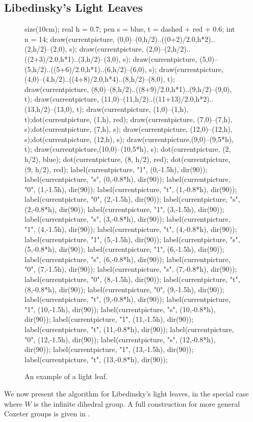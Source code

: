 \subsection{Libedinsky's Light Leaves}
\label{sec:prelim_lightleave}
\begin{figure}[ht]
	\centering
	\begin{asy}
	size(10cm);
	real h = 0.7;
	pen s = blue, t = dashed + red + 0.6;
	int n = 14;
	draw(currentpicture, (0,0)--(0,h/2)..((0+2)/2.0,h*2)..(2,h/2)--(2,0), s);
	draw(currentpicture, (2,0)--(2,h/2)..((2+3)/2.0,h*1)..(3,h/2)--(3,0), s);
	draw(currentpicture, (5,0)--(5,h/2)..((5+6)/2.0,h*1)..(6,h/2)--(6,0), s);
	draw(currentpicture, (4,0)--(4,h/2)..((4+8)/2.0,h*4)..(8,h/2)--(8,0), t);
	draw(currentpicture, (8,0)--(8,h/2)..((8+9)/2.0,h*1)..(9,h/2)--(9,0), t);
	draw(currentpicture, (11,0)--(11,h/2)..((11+13)/2.0,h*2)..(13,h/2)--(13,0), t);
	draw(currentpicture, (1,0)--(1,h), t);dot(currentpicture, (1,h), red);
	draw(currentpicture, (7,0)--(7,h), s);dot(currentpicture, (7,h), s);
	draw(currentpicture, (12,0)--(12,h), s);dot(currentpicture, (12,h), s);
	draw(currentpicture,(9,0)--(9,5*h), t);
	draw(currentpicture,(10,0)--(10,5*h), s);
	dot(currentpicture, (2, h/2), blue);
	dot(currentpicture, (8, h/2), red);
	dot(currentpicture, (9, h/2), red);
	label(currentpicture, "1", (0,-1.5h), dir(90));
	label(currentpicture, "s", (0,-0.8*h), dir(90));
	label(currentpicture, "0", (1,-1.5h), dir(90));
	label(currentpicture, "t", (1,-0.8*h), dir(90));
	label(currentpicture, "0", (2,-1.5h), dir(90));
	label(currentpicture, "s", (2,-0.8*h), dir(90));
	label(currentpicture, "1", (3,-1.5h), dir(90));
	label(currentpicture, "s", (3,-0.8*h), dir(90));
	label(currentpicture, "1", (4,-1.5h), dir(90));
	label(currentpicture, "t", (4,-0.8*h), dir(90));
	label(currentpicture, "1", (5,-1.5h), dir(90));
	label(currentpicture, "s", (5,-0.8*h), dir(90));
	label(currentpicture, "1", (6,-1.5h), dir(90));
	label(currentpicture, "s", (6,-0.8*h), dir(90));
	label(currentpicture, "0", (7,-1.5h), dir(90));
	label(currentpicture, "s", (7,-0.8*h), dir(90));
	label(currentpicture, "0", (8,-1.5h), dir(90));
	label(currentpicture, "t", (8,-0.8*h), dir(90));
	label(currentpicture, "0", (9,-1.5h), dir(90));
	label(currentpicture, "t", (9,-0.8*h), dir(90));
	label(currentpicture, "1", (10,-1.5h), dir(90));
	label(currentpicture, "s", (10,-0.8*h), dir(90));
	label(currentpicture, "1", (11,-1.5h), dir(90));
	label(currentpicture, "t", (11,-0.8*h), dir(90));
	label(currentpicture, "0", (12,-1.5h), dir(90));
	label(currentpicture, "s", (12,-0.8*h), dir(90));
	label(currentpicture, "1", (13,-1.5h), dir(90));
	label(currentpicture, "t", (13,-0.8*h), dir(90));
	\end{asy}
	\caption{An example of a light leaf.}
	\label{fig:lightleaf_example}
\end{figure}
We now present the algorithm for Libedinsky's light leaves, in the special case where $W$ is the infinite dihedral group.  A full construction for more general Coxeter groups is given in \cite{ref:gr4all}.

